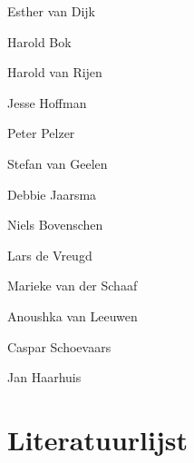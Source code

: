 \documentclass[smallauthor, chapterhaspagenum, nochapterinheader, pagenuminheader,  bigchapnum,medium2, tocpages,  garamond, titleinheader]{jote-book}
\begin{document}
	\begin{references}


		Esther van Dijk

		Harold Bok



		Harold van Rijen



		Jesse Hoffman



		Peter Pelzer



		Stefan van Geelen



		Debbie Jaarsma



		Niels Bovenschen



		Lars de Vreugd



		Marieke van der Schaaf



		Anoushka van Leeuwen



		Caspar Schoevaars



		Jan Haarhuis


	\end{references}












	\chapter*{Literatuurlijst }

	\nochapterinheader
\end{document}
